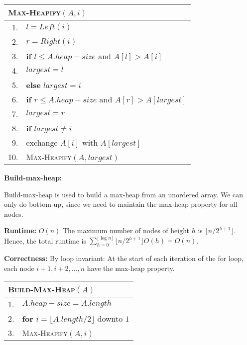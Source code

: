 \documentclass[a4paper,12pt]{article}
\begin{document}
\begin{center}
	\begin{tabular}{rl}
		\toprule
		\multicolumn{2}{l}{\textsc{Max-Heapify}$(A, i)$} \\
		\midrule
		1. & $l = Left(i)$ \\
		2. & $r = Right(i)$ \\
		3. & \textbf{if} $l \leq A.heap-size$ and $A[l] > A[i]$ \\
		4. & \quad $largest = l$ \\
		5. & \textbf{else} $largest = i$ \\
		6. & \textbf{if} $r \leq A.heap-size$ and $A[r] > A[largest]$ \\
		7. & \quad $largest = r$ \\
		8. & \textbf{if} $largest \neq i$ \\
		9. & \quad exchange $A[i]$ with $A[largest]$ \\
		10. & \quad \textsc{Max-Heapify}$(A, largest)$ \\
		\bottomrule
	\end{tabular}
\end{center}

\vspace{1cm}
\textbf{Build-max-heap:}

Build-max-heap is used to build a max-heap from an unordered array.
We can only do bottom-up, since we need to maintain the max-heap property for all nodes.

\textbf{Runtime:} 
$O(n)$
The maximum number of nodes of height $h$ is $\lfloor n / 2^{h + 1} \rfloor$.
Hence, the total runtime is $\sum_{h = 0}^{\lfloor \log n \rfloor} \lfloor n / 2^{h + 1} \rfloor O(h) = O(n)$.

\textbf{Correctness:} 
By loop invariant:
At the start of each iteration of the for loop, each node $i + 1, i + 2, \dots, n$ have the max-heap property.

\begin{center}
	\begin{tabular}{rl}
		\toprule
		\multicolumn{2}{l}{\textsc{Build-Max-Heap}$(A)$} \\
		\midrule
		1. & $A.heap-size = A.length$ \\
		2. & \textbf{for} $i = \lfloor A.length / 2 \rfloor$ downto $1$ \\
		3. & \quad \textsc{Max-Heapify}$(A, i)$ \\
		\bottomrule
	\end{tabular}
\end{center}
\end{document}
